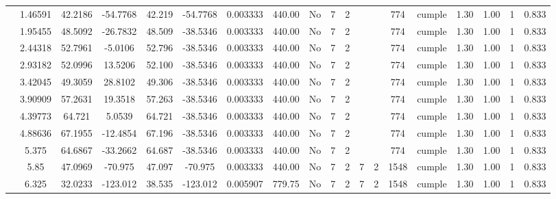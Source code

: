 \begin{table}[H]
{\begin{tabular}{|c|c|c|c|c|c|r|c|c|c|c|c|c|c|c|c|c|c|c|}
\cline{2-19}        & 1.46591 & 42.2186 & -54.7768 & 42.219 & -54.7768 & 0.003333 & 440.00 & No  & 7   & 2   &     &     & 774 & \cellcolor[rgb]{ .776,  .937,  .808}cumple & 1.30 & 1.00 & 1   & 0.833 \bigstrut\\
\cline{2-19}        & 1.95455 & 48.5092 & -26.7832 & 48.509 & -38.5346 & 0.003333 & 440.00 & No  & 7   & 2   &     &     & 774 & \cellcolor[rgb]{ .776,  .937,  .808}cumple & 1.30 & 1.00 & 1   & 0.833 \bigstrut\\
\cline{2-19}        & 2.44318 & 52.7961 & -5.0106 & 52.796 & -38.5346 & 0.003333 & 440.00 & No  & 7   & 2   &     &     & 774 & \cellcolor[rgb]{ .776,  .937,  .808}cumple & 1.30 & 1.00 & 1   & 0.833 \bigstrut\\
\cline{2-19}        & 2.93182 & 52.0996 & 13.5206 & 52.100 & -38.5346 & 0.003333 & 440.00 & No  & 7   & 2   &     &     & 774 & \cellcolor[rgb]{ .776,  .937,  .808}cumple & 1.30 & 1.00 & 1   & 0.833 \bigstrut\\
\cline{2-19}        & 3.42045 & 49.3059 & 28.8102 & 49.306 & -38.5346 & 0.003333 & 440.00 & No  & 7   & 2   &     &     & 774 & \cellcolor[rgb]{ .776,  .937,  .808}cumple & 1.30 & 1.00 & 1   & 0.833 \bigstrut\\
\cline{2-19}        & 3.90909 & 57.2631 & 19.3518 & 57.263 & -38.5346 & 0.003333 & 440.00 & No  & 7   & 2   &     &     & 774 & \cellcolor[rgb]{ .776,  .937,  .808}cumple & 1.30 & 1.00 & 1   & 0.833 \bigstrut\\
\cline{2-19}        & 4.39773 & 64.721 & 5.0539 & 64.721 & -38.5346 & 0.003333 & 440.00 & No  & 7   & 2   &     &     & 774 & \cellcolor[rgb]{ .776,  .937,  .808}cumple & 1.30 & 1.00 & 1   & 0.833 \bigstrut\\
\cline{2-19}        & 4.88636 & 67.1955 & -12.4854 & 67.196 & -38.5346 & 0.003333 & 440.00 & No  & 7   & 2   &     &     & 774 & \cellcolor[rgb]{ .776,  .937,  .808}cumple & 1.30 & 1.00 & 1   & 0.833 \bigstrut\\
\cline{2-19}        & 5.375 & 64.6867 & -33.2662 & 64.687 & -38.5346 & 0.003333 & 440.00 & No  & 7   & 2   &     &     & 774 & \cellcolor[rgb]{ .776,  .937,  .808}cumple & 1.30 & 1.00 & 1   & 0.833 \bigstrut\\
\cline{2-19}        & 5.85 & 47.0969 & -70.975 & 47.097 & -70.975 & 0.003333 & 440.00 & No  & 7   & 2   & 7   & 2   & 1548 & \cellcolor[rgb]{ .776,  .937,  .808}cumple & 1.30 & 1.00 & 1   & 0.833 \bigstrut\\
\cline{2-19}        & 6.325 & 32.0233 & -123.012 & 38.535 & -123.012 & 0.005907 & 779.75 & No  & 7   & 2   & 7   & 2   & 1548 & \cellcolor[rgb]{ .776,  .937,  .808}cumple & 1.30 & 1.00 & 1   & 0.833 \bigstrut\\

\end{tabular}}
\end{table}
